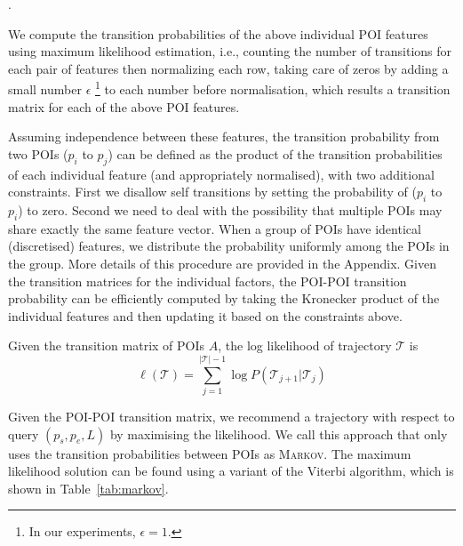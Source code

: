 .



We compute the transition probabilities of the above individual POI features
using maximum likelihood estimation,
i.e., counting the number of transitions for each pair of features then normalizing each row,
taking care of zeros by adding a small number $\epsilon$
\footnote{In our experiments, $\epsilon = 1$.}
to each number before normalisation,
which results a transition matrix for each of the above POI features.

Assuming independence between these features,
the transition probability from two POIs ($p_i$ to $p_j$) can be defined as the product
of the transition probabilities of each individual feature (and appropriately normalised),
with two additional constraints.
First we disallow self transitions by setting the probability of ($p_i$ to $p_i$) to zero.
Second we need to deal with the possibility that multiple POIs may share exactly the same
feature vector.
When a group of POIs have identical (discretised) features, we distribute the probability
uniformly among the POIs in the group. More details of this procedure are provided in the Appendix.
Given the transition matrices for the individual factors, the POI-POI transition probability
can be efficiently computed by taking the Kronecker product of the individual features
and then updating it based on the constraints above.

Given the transition matrix of POIs $A$, the log likelihood of trajectory $\mathcal{T}$ is
\begin{displaymath}
    \ell(\mathcal{T}) = \sum_{j=1}^{|\mathcal{T}|-1} \log P(\mathcal{T}_{j+1} | \mathcal{T}_j)
\end{displaymath}

Given the POI-POI transition matrix, we recommend a trajectory with respect to query
$(p_s, p_e, L)$ by maximising the likelihood. We call this approach that only uses the
transition probabilities between POIs as \textsc{Markov}. The maximum likelihood solution
can be found using a variant of the Viterbi algorithm, which is shown in Table~\ref{tab:markov}.


